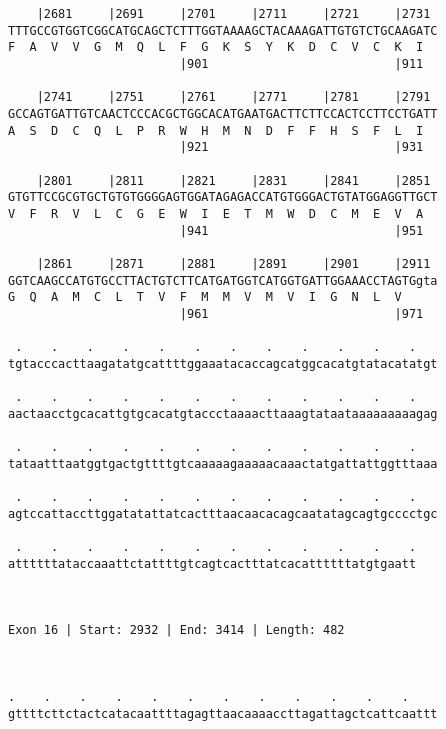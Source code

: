 \documentclass{article}
\begin{document}
\begin{Verbatim}
    |2681     |2691     |2701     |2711     |2721     |2731 
TTTGCCGTGGTCGGCATGCAGCTCTTTGGTAAAAGCTACAAAGATTGTGTCTGCAAGATC
F  A  V  V  G  M  Q  L  F  G  K  S  Y  K  D  C  V  C  K  I  
                        |901                          |911  
  
    |2741     |2751     |2761     |2771     |2781     |2791 
GCCAGTGATTGTCAACTCCCACGCTGGCACATGAATGACTTCTTCCACTCCTTCCTGATT
A  S  D  C  Q  L  P  R  W  H  M  N  D  F  F  H  S  F  L  I  
                        |921                          |931  
  
    |2801     |2811     |2821     |2831     |2841     |2851 
GTGTTCCGCGTGCTGTGTGGGGAGTGGATAGAGACCATGTGGGACTGTATGGAGGTTGCT
V  F  R  V  L  C  G  E  W  I  E  T  M  W  D  C  M  E  V  A  
                        |941                          |951  
  
    |2861     |2871     |2881     |2891     |2901     |2911 
GGTCAAGCCATGTGCCTTACTGTCTTCATGATGGTCATGGTGATTGGAAACCTAGTGgta
G  Q  A  M  C  L  T  V  F  M  M  V  M  V  I  G  N  L  V     
                        |961                          |971  
  
 .    .    .    .    .    .    .    .    .    .    .    .   
tgtacccacttaagatatgcattttggaaatacaccagcatggcacatgtatacatatgt
                                                            
 .    .    .    .    .    .    .    .    .    .    .    .   
aactaacctgcacattgtgcacatgtaccctaaaacttaaagtataataaaaaaaaagag
                                                            
 .    .    .    .    .    .    .    .    .    .    .    .   
tataatttaatggtgactgttttgtcaaaaagaaaaacaaactatgattattggtttaaa
                                                            
 .    .    .    .    .    .    .    .    .    .    .    .   
agtccattaccttggatatattatcactttaacaacacagcaatatagcagtgcccctgc
                                                            
 .    .    .    .    .    .    .    .    .    .    .    .
attttttataccaaattctattttgtcagtcactttatcacattttttatgtgaatt
                                                         
                                                         
 
Exon 16 | Start: 2932 | End: 3414 | Length: 482



.    .    .    .    .    .    .    .    .    .    .    .    
gttttcttctactcatacaattttagagttaacaaaaccttagattagctcattcaattt
                                                            

\end{Verbatim}
\end{document}

